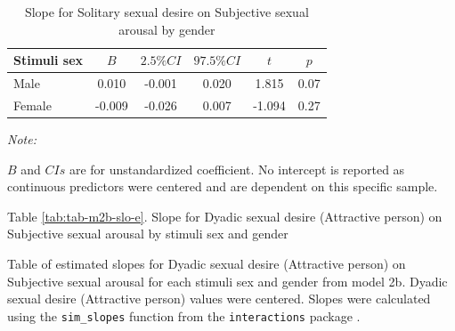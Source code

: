 \documentclass[
  bookmarksnumbered]{article}
\begin{document}
\begin{table}[H]

\caption{\label{tab:tab-m2b-slo-d}Slope for Solitary sexual desire on Subjective sexual arousal by gender}
\centering
\begin{threeparttable}
\begin{tabular}[t]{lccccc}
\toprule
Stimuli sex & $B$ & $2.5\% CI$ & $97.5\% CI$ & $t$ & $p$\\
\midrule
Male & 0.010 & -0.001 & 0.020 & 1.815 & 0.07\\
Female & -0.009 & -0.026 & 0.007 & -1.094 & 0.27\\
\bottomrule
\end{tabular}
\begin{tablenotes}[para]
\item \textit{Note: } 
\item $B$ and $CIs$ are for unstandardized coefficient.
           No intercept is reported as continuous predictors were centered
           and are dependent on this specific sample.
\end{tablenotes}
\end{threeparttable}
\end{table}

Table \ref{tab:tab-m2b-slo-e}. Slope for Dyadic sexual desire (Attractive person) on Subjective sexual arousal by stimuli sex and gender

Table of estimated slopes for Dyadic sexual desire (Attractive person) on Subjective sexual arousal for each stimuli sex and gender from model 2b. Dyadic sexual desire (Attractive person) values were centered. Slopes were calculated using the \texttt{sim\_slopes} function from the \texttt{interactions} package \autocite{interactionscit}.
\end{document}
